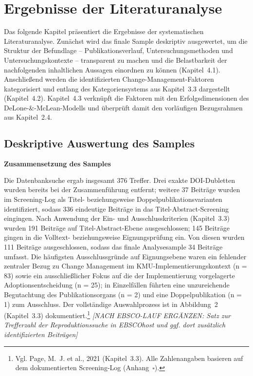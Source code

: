 \section{Ergebnisse der Literaturanalyse}

Das folgende Kapitel pr\"asentiert die Ergebnisse der systematischen Literaturanalyse. Zun\"achst wird das finale Sample deskriptiv ausgewertet, um die Struktur der Befundlage -- Publikationsverlauf, Untersuchungsmethoden und Untersuchungskontexte -- transparent zu machen und die Belastbarkeit der nachfolgenden inhaltlichen Aussagen einordnen zu k\"onnen (Kapitel~4.1). Anschlie\ss{}end werden die identifizierten Change-Management-Faktoren kategorisiert und entlang des Kategoriensystems aus Kapitel~3.3 dargestellt (Kapitel~4.2). Kapitel~4.3 verkn\"upft die Faktoren mit den Erfolgsdimensionen des DeLone-\&-McLean-Modells und \"uberpr\"uft damit den vorl\"aufigen Bezugsrahmen aus Kapitel~2.4.

\subsection{Deskriptive Auswertung des Samples}

\textbf{Zusammensetzung des Samples}

Die Datenbanksuche ergab insgesamt 376 Treffer. Drei exakte DOI-Dubletten wurden bereits bei der Zusammenf\"uhrung entfernt; weitere 37 Beitr\"age wurden im Screening-Log als Titel- beziehungsweise Doppelpublikationsvarianten identifiziert, sodass 336 eindeutige Beitr\"age in das Titel-Abstract-Screening eingingen. Nach Anwendung der Ein- und Ausschlusskriterien (Kapitel~3.3) wurden 191 Beitr\"age auf Titel-Abstract-Ebene ausgeschlossen; 145 Beitr\"age gingen in die Volltext- beziehungsweise Eignungspr\"ufung ein. Von diesen wurden 111 Beitr\"age ausgeschlossen, sodass das finale Analysesample 34 Beitr\"age umfasst. Die h\"aufigsten Ausschlussgr\"unde auf Eignungsebene waren ein fehlender zentraler Bezug zu Change Management im KMU-Implementierungskontext (n = 83) sowie ein ausschlie\ss{}licher Fokus auf die der Implementierung vorgelagerte Adoptionsentscheidung (n = 25); in Einzelf\"allen f\"uhrten eine unzureichende Begutachtung des Publikationsorgans (n = 2) und eine Doppelpublikation (n = 1) zum Ausschluss. Der vollst\"andige Auswahlprozess ist in Abbildung~2 (Kapitel~3.3) dokumentiert.\footnote{Vgl. Page, M.~J. et al., 2021 (Kapitel~3.3). Alle Zahlenangaben basieren auf dem dokumentierten Screening-Log (Anhang~$\square$).} \textit{[NACH EBSCO-LAUF ERG\"ANZEN: Satz zur Trefferzahl der Reproduktionssuche in EBSCOhost und ggf. dort zus\"atzlich identifizierten Beitr\"agen]}

